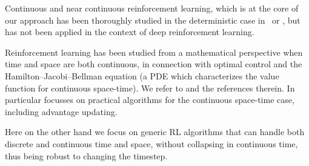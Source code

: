 Continuous and near continuous reinforcement learning, which is at the core of
our approach has been thoroughly studied in the deterministic case
in~\cite{adv_upd} or \cite{cont_rl}, but has not been applied in the context of
deep reinforcement learning.

Reinforcement learning has been studied from a mathematical perspective
when time and space are both continuous, in connection with optimal
control and the Hamilton--Jacobi--Bellman equation (a PDE which
characterizes the value function for continuous space-time). We refer to
\cite{cont_rl} and the references therein. In particular   \cite{cont_rl} focusses on practical
algorithms for the continuous space-time case, including advantage
updating.

Here on the other hand we focus on generic RL algorithms that can handle
both discrete and continuous time and space, without collapsing in
continuous time, thus being robust to changing the timestep.


